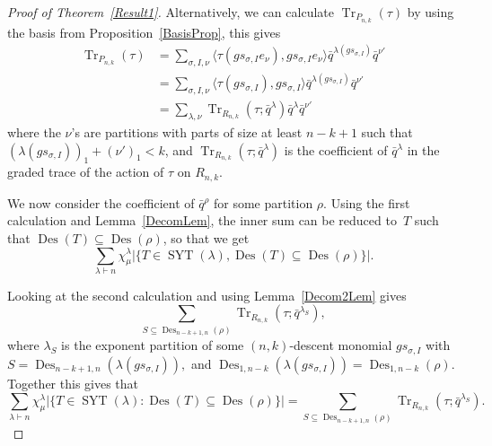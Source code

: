 \documentclass[ALCO,ThmDefs,Unicode,epreuves]{cedram}
\DeclareMathOperator{\Des}{Des}
\DeclareMathOperator{\SYT}{SYT}
\DeclareMathOperator{\Tr}{Tr}
\begin{document}
\begin{proof}[Proof of Theorem~\ref{Result1}]
		Alternatively, we can calculate $\Tr _{P_{n,k}}(\tau)$ by using the basis from Proposition~\ref{BasisProp}, this gives
\begin{align}\Tr _{P_{n,k}}(\tau)&=\sum_{\sigma,I,\nu} \langle \tau(gs_{\sigma,I} e_\nu),gs_{\sigma,I} e_\nu\rangle 
\bar{q}^{\lambda(gs_{\sigma,I})}\bar{q}^{\nu'}\\
&=\sum_{\sigma,I,\nu} \langle \tau(gs_{\sigma,I}),gs_{\sigma,I} \rangle \bar{q}^{\lambda(gs_{\sigma,I})}\bar{q}^{\nu'}\\
&=\sum_{\lambda,\nu} \Tr _{R_{n,k}}(\tau; \bar{q}^\lambda)\bar{q}^{\lambda}\bar{q}^{\nu'}\end{align}
where the $\nu$'s are partitions with parts of size at least $n-k+1$ such that $(\lambda(gs_{\sigma,I}))_1+(\nu')_1<k$, and 
$\Tr _{R_{n,k}}(\tau;\bar{q}^\lambda)$ is the coefficient of $\bar{q}^\lambda$ in the graded trace of the action of $\tau$ on 
$R_{n,k}$.

		We now consider the coefficient of $\bar{q}^\rho$ for some partition $\rho$. Using the first calculation and Lemma~\ref{DecomLem}, the inner sum can be reduced to~$T$ such that $\Des (T)\subseteq \Des (\rho)$, so that we 
get
\begin{equation}
\sum_{\lambda\vdash n} \chi^\lambda_\mu\vert \{T\in \SYT (\lambda), \Des (T)\subseteq 
\Des (\rho)\}\vert.
\end{equation}

Looking at the second calculation and using Lemma~\ref{Decom2Lem} gives
\begin{equation}
\sum_{S\subseteq \Des _{n-k+1,n}(\rho)} 
\Tr _{R_{n,k}}(\tau;\bar{q}^{\lambda_S}),
\end{equation}
where $\lambda_S$ is the exponent partition of some $(n,k)$-descent 
monomial $gs_{\sigma, I}$ with $S=\Des _{n-k+1,n}(\lambda(gs_{\sigma, I})),$ and 
$\Des _{1,n-k}(\lambda(gs_{\sigma,I}))=\Des _{1,n-k}(\rho)$. Together this gives that
\begin{equation}
\sum_{\lambda\vdash n} 
\chi^\lambda_\mu\vert \{T\in \SYT (\lambda): \Des (T)\subseteq \Des (\rho)\}\vert=\sum_{S\subseteq \Des _{n-k+1,n}(\rho)} 
\Tr _{R_{n,k}}(\tau;\bar{q}^{\lambda_S}).
\end{equation}



\end{proof}
\end{document}

